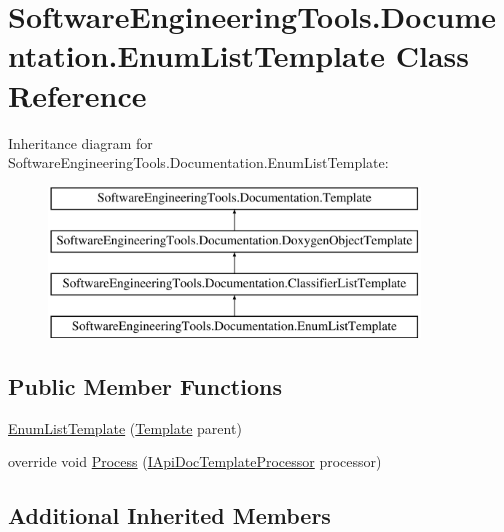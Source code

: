 \hypertarget{class_software_engineering_tools_1_1_documentation_1_1_enum_list_template}{\section{Software\+Engineering\+Tools.\+Documentation.\+Enum\+List\+Template Class Reference}
\label{class_software_engineering_tools_1_1_documentation_1_1_enum_list_template}
}
Inheritance diagram for Software\+Engineering\+Tools.\+Documentation.\+Enum\+List\+Template\+:\begin{figure}[H]
\begin{center}
\leavevmode
\includegraphics[height=4.000000cm]{class_software_engineering_tools_1_1_documentation_1_1_enum_list_template}
\end{center}
\end{figure}
\subsection*{Public Member Functions}
\begin{DoxyCompactItemize}
\item 
\hyperlink{class_software_engineering_tools_1_1_documentation_1_1_enum_list_template_a212453829ef5593c4972b33330b75ffd}{Enum\+List\+Template} (\hyperlink{class_software_engineering_tools_1_1_documentation_1_1_template}{Template} parent)
\item 
override void \hyperlink{class_software_engineering_tools_1_1_documentation_1_1_enum_list_template_ab40ecbc15d3643dcd54cc7c4fdc7a42e}{Process} (\hyperlink{interface_software_engineering_tools_1_1_documentation_1_1_i_api_doc_template_processor}{I\+Api\+Doc\+Template\+Processor} processor)
\end{DoxyCompactItemize}
\subsection*{Additional Inherited Members}


